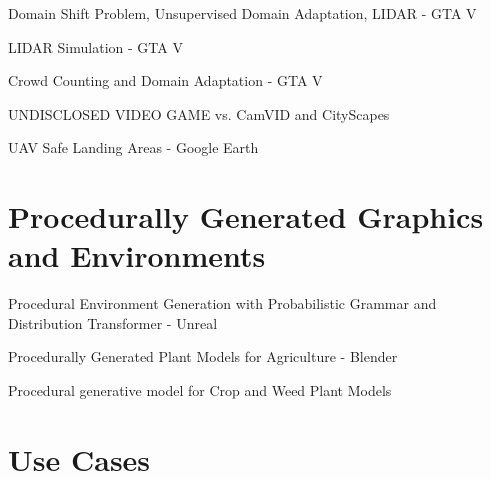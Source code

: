 Domain Shift Problem, Unsupervised Domain Adaptation, LIDAR - GTA V \cite{wu2019squeezesegv2}

LIDAR Simulation - GTA V \cite{hurl2019precise}

Crowd Counting and Domain Adaptation - GTA V \cite{wang2019learning}

UNDISCLOSED VIDEO GAME vs. CamVID and CityScapes \cite{shafaei2016play}

UAV Safe Landing Areas - Google Earth \cite{marcu2018safeuav}


\section{Procedurally Generated Graphics and Environments}
\label{sec:procedurally-generated}

Procedural Environment Generation with Probabilistic Grammar and Distribution Transformer - Unreal \cite{kar2019meta}

Procedurally Generated Plant Models for Agriculture - Blender \cite{barth2018data}

Procedural generative model for Crop and Weed Plant Models \cite{di2017automatic}

\section{Use Cases}
\label{sec:use-cases}

